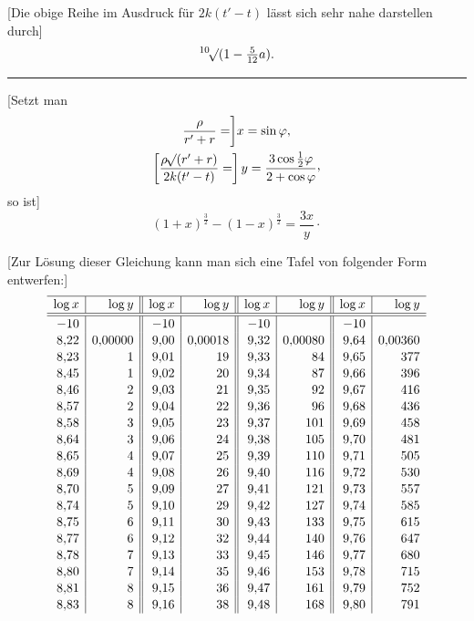 [Die obige Reihe im Ausdruck für \(2k(t'-t)\) lässt sich sehr nahe darstellen durch]
\[
\BareRoot[10]{(1-\tfrac5{12}a)}.
\]
\begin{center}\rule{.3\linewidth}{.4pt}\end{center}

[Setzt man
\[
\begin{gathered}
\frac{\rho}{r'+r}=\biggr]x=\sin\varphi,\\
\left[\frac{\rho\BareRoot{(r'+r)}}{2k(t'-t)}=\right]y=\frac{3\cos\tfrac12\varphi}{2+\cos\varphi}\mathpunct{\raisebox{.45ex}{,}}
\end{gathered}
\]
so ist]
\[
(1+x)^{\frac32}-(1-x)^{\frac32}=\frac{3x}y\mathpunct{\cdot}
\]

[Zur Lösung dieser Gleichung kann man sich eine Tafel von folgender Form entwerfen:]
\[
\setlength{\arraycolsep}{5pt}
\renewcommand{\arraystretch}{1.08}
\begin{array}{r|r||r|r||r|r||r|r}
\hline
\log x&\log y&\log x&\log y&\log x&\log y&\log x&\log y\\
\hline\hline
-10&&-10&&-10&&-10&\\
8{,}22&0{,}00000&9{,}00&0{,}00018&9{,}32&0{,}00080&9{,}64&0{,}00360\\
8{,}23&1&9{,}01&19&9{,}33&84&9{,}65&377\\
8{,}45&1&9{,}02&20&9{,}34&87&9{,}66&396\\
8{,}46&2&9{,}03&21&9{,}35&92&9{,}67&416\\
8{,}57&2&9{,}04&22&9{,}36&96&9{,}68&436\\
8{,}58&3&9{,}05&23&9{,}37&101&9{,}69&458\\
8{,}64&3&9{,}06&24&9{,}38&105&9{,}70&481\\
8{,}65&4&9{,}07&25&9{,}39&110&9{,}71&505\\
8{,}69&4&9{,}08&26&9{,}40&116&9{,}72&530\\
8{,}70&5&9{,}09&27&9{,}41&121&9{,}73&557\\
8{,}74&5&9{,}10&29&9{,}42&127&9{,}74&585\\
8{,}75&6&9{,}11&30&9{,}43&133&9{,}75&615\\
8{,}77&6&9{,}12&32&9{,}44&140&9{,}76&647\\
8{,}78&7&9{,}13&33&9{,}45&146&9{,}77&680\\
8{,}80&7&9{,}14&35&9{,}46&153&9{,}78&715\\
8{,}81&8&9{,}15&36&9{,}47&161&9{,}79&752\\
8{,}83&8&9{,}16&38&9{,}48&168&9{,}80&791\\

\end{array}\]
